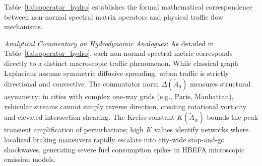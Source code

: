 \documentclass[journal]{IEEEtran}
\begin{document}
Table~\ref{tab:operator_hydro} establishes the formal mathematical correspondence between non-normal spectral matrix operators and physical traffic flow mechanisms.

\begin{table}[htbp]
\caption{Mathematical Operators and Equivalent Hydrodynamic Traffic Flow Phenomena}
\label{tab:operator_hydro}
\centering
{}
\end{table}

\textit{Analytical Commentary on Hydrodynamic Analogues}:
As detailed in Table~\ref{tab:operator_hydro}, each non-normal spectral metric corresponds directly to a distinct macroscopic traffic phenomenon. While classical graph Laplacians assume symmetric diffusive spreading, urban traffic is strictly directional and convective. The commutator norm $\Delta(\tilde{A}_0)$ measures structural asymmetry: in cities with complex one-way grids (e.g., Paris, Manhattan), vehicular streams cannot simply reverse direction, creating rotational vorticity and elevated intersection shearing. The Kreiss constant $K(\tilde{A}_w)$ bounds the peak transient amplification of perturbations; high $K$ values identify networks where localized braking maneuvers rapidly escalate into city-wide stop-and-go shockwaves, generating severe fuel consumption spikes in HBEFA microscopic emission models.
\end{document}
